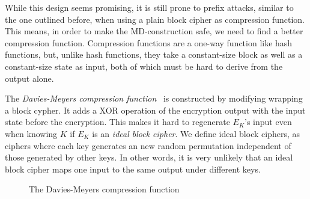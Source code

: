 While this design seems promising, it is still prone to prefix attacks, similar to the one outlined before, when using a plain block cipher as compression function.
This means, in order to make the MD-construction safe, we need to find a better compression function.
Compression functions are a one-way function like hash functions, but, unlike hash functions, they take a constant-size block as well as a constant-size state as input, both of which must be hard to derive from the output alone.

The \emph{Davies-Meyers compression function}~\cite{winternitz1984secure,black2002black} is constructed by modifying wrapping a block cypher.
It adds a XOR operation of the encryption output with the input state before the encryption.
This makes it hard to regenerate $E_K$'s input even when knowing $K$ if $E_K$ is an \emph{ideal block cipher}.
We define ideal block ciphers, as ciphers where each key generates an new random permutation independent of those generated by other keys.
In other words, it is very unlikely that an ideal block cipher maps one input to the same output under different keys.

\begin{figure}
\centering
\caption{The Davies-Meyers compression function}
\end{figure}

